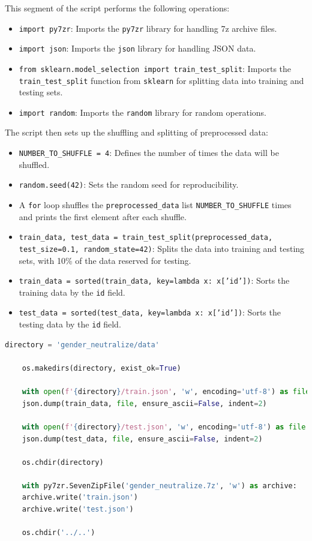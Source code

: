 \documentclass{solutionclass} %
\begin{document}
\begin{solution}
This segment of the script performs the following operations:

\begin{itemize}
	\item \texttt{import py7zr}: Imports the \texttt{py7zr} library for handling 7z archive files.
	\item \texttt{import json}: Imports the \texttt{json} library for handling JSON data.
	\item \texttt{from sklearn.model\_selection import train\_test\_split}: Imports the \texttt{train\_test\_split} function from \texttt{sklearn} for splitting data into training and testing sets.
	\item \texttt{import random}: Imports the \texttt{random} library for random operations.
\end{itemize}


The script then sets up the shuffling and splitting of preprocessed data:

\begin{itemize}
	\item \texttt{NUMBER\_TO\_SHUFFLE = 4}: Defines the number of times the data will be shuffled.
	\item \texttt{random.seed(42)}: Sets the random seed for reproducibility.
	\item A \texttt{for} loop shuffles the \texttt{preprocessed\_data} list \texttt{NUMBER\_TO\_SHUFFLE} times and prints the first element after each shuffle.
	\item \texttt{train\_data, test\_data = train\_test\_split(preprocessed\_data, test\_size=0.1, random\_state=42)}: Splits the data into training and testing sets, with 10\% of the data reserved for testing.
	\item \texttt{train\_data = sorted(train\_data, key=lambda x: x['id'])}: Sorts the training data by the \texttt{id} field.
	\item \texttt{test\_data = sorted(test\_data, key=lambda x: x['id'])}: Sorts the testing data by the \texttt{id} field.
\end{itemize}
\end{solution}



\begin{lstlisting}[language=Python]
	directory = 'gender_neutralize/data'
	
	os.makedirs(directory, exist_ok=True)
	
	with open(f'{directory}/train.json', 'w', encoding='utf-8') as file:
	json.dump(train_data, file, ensure_ascii=False, indent=2)
	
	with open(f'{directory}/test.json', 'w', encoding='utf-8') as file:
	json.dump(test_data, file, ensure_ascii=False, indent=2)
	
	os.chdir(directory)
	
	with py7zr.SevenZipFile('gender_neutralize.7z', 'w') as archive:
	archive.write('train.json')
	archive.write('test.json')
	
	os.chdir('../..')
\end{lstlisting}
\end{document}
